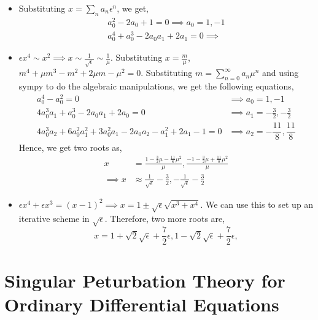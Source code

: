 \documentclass[a4paper,11pt]{article}
\begin{document}
\begin{itemize}
	\item Substituting $ x = \sum_{n} a_n \epsilon^n $, we get,
	\begin{align*}
	a_0^2 -2a_0 +1 = 0 \implies a_0 = 1,-1 \\
	a_0^4 +a_0^3 - 2 a_0 a_1 + 2 a_1 = 0 \implies 
	\end{align*}
	\item $ \epsilon x^4 \sim x^2 \implies x \sim \frac{1}{\sqrt{\epsilon}} \sim \frac{1}{\mu} $. Substituting $ x = \frac{m}{\mu} $, $ m^4 + \mu m^3 - m^2 + 2 \mu m - \mu^2 = 0$. Substituting $ m = \sum_{n=0}^{\infty} a_n \mu^n $ and using sympy to do the algebraic manipulations, we get the following equations,
	\begin{align*}
	a_0^4 - a_0^2 = 0 &\implies a_0 = 1,-1 \\
	4 a_0^3 a_1 + a_0^3 - 2 a_0 a_1 + 2 a_0 = 0 &\implies a_1 = -\frac{3}{2}, -\frac{3}{2} \\
	4 a_0^3 a_2 + 6 a_0^2 a_1^2 + 3 a_0^2 a_1 -2 a_0 a_2 - a_1^2 +2 a_1 - 1 = 0 &\implies a_2 = -\dfrac{11}{8}, \dfrac{11}{8}
	\end{align*}
	Hence, we get two roots as,
	\begin{align*}
	x &= \frac{1 -\frac{3}{2}\mu - \frac{11}{8} \mu^2}{\mu}, \frac{-1 -\frac{3}{2}\mu + \frac{11}{8} \mu^2}{\mu} \\
	\implies x &\approx \frac{1}{\sqrt{\epsilon}} -\frac{3}{2}, -\frac{1}{\sqrt{\epsilon}} -\frac{3}{2}
	\end{align*}
	\item $ \epsilon x^4 + \epsilon x^3 = (x-1)^2 \implies x = 1 \pm \sqrt{\epsilon} \sqrt{x^3 + x^4}$. We can use this to set up an iterative scheme in $ \sqrt{\epsilon} $. Therefore, two more roots are,
	\begin{equation*}
	x = 1 + \sqrt{2} \sqrt{\epsilon} + \dfrac{7}{2} \epsilon, 1 - \sqrt{2} \sqrt{\epsilon} + \dfrac{7}{2} \epsilon, 
	\end{equation*}
\end{itemize}
	
\section{Singular Peturbation Theory for Ordinary Differential Equations}
\end{document}
